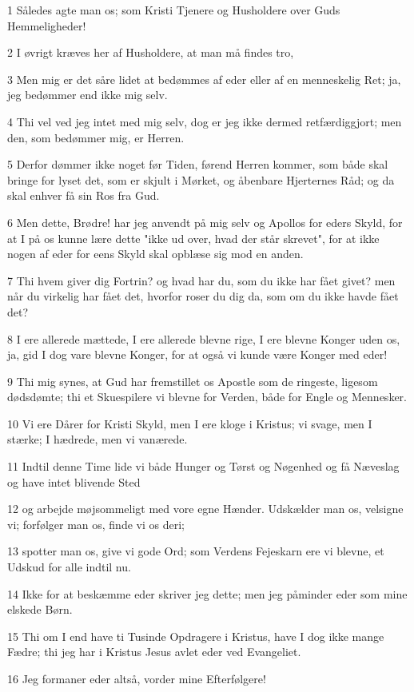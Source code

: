 \par 1 Således agte man os; som Kristi Tjenere og Husholdere over Guds Hemmeligheder!
\par 2 I øvrigt kræves her af Husholdere, at man må findes tro,
\par 3 Men mig er det såre lidet at bedømmes af eder eller af en menneskelig Ret; ja, jeg bedømmer end ikke mig selv.
\par 4 Thi vel ved jeg intet med mig selv, dog er jeg ikke dermed retfærdiggjort; men den, som bedømmer mig, er Herren.
\par 5 Derfor dømmer ikke noget før Tiden, førend Herren kommer, som både skal bringe for lyset det, som er skjult i Mørket, og åbenbare Hjerternes Råd; og da skal enhver få sin Ros fra Gud.
\par 6 Men dette, Brødre! har jeg anvendt på mig selv og Apollos for eders Skyld, for at I på os kunne lære dette "ikke ud over, hvad der står skrevet", for at ikke nogen af eder for eens Skyld skal opblæse sig mod en anden.
\par 7 Thi hvem giver dig Fortrin? og hvad har du, som du ikke har fået givet? men når du virkelig har fået det, hvorfor roser du dig da, som om du ikke havde fået det?
\par 8 I ere allerede mættede, I ere allerede blevne rige, I ere blevne Konger uden os, ja, gid I dog vare blevne Konger, for at også vi kunde være Konger med eder!
\par 9 Thi mig synes, at Gud har fremstillet os Apostle som de ringeste, ligesom dødsdømte; thi et Skuespilere vi blevne for Verden, både for Engle og Mennesker.
\par 10 Vi ere Dårer for Kristi Skyld, men I ere kloge i Kristus; vi svage, men I stærke; I hædrede, men vi vanærede.
\par 11 Indtil denne Time lide vi både Hunger og Tørst og Nøgenhed og få Næveslag og have intet blivende Sted
\par 12 og arbejde møjsommeligt med vore egne Hænder. Udskælder man os, velsigne vi; forfølger man os, finde vi os deri;
\par 13 spotter man os, give vi gode Ord; som Verdens Fejeskarn ere vi blevne, et Udskud for alle indtil nu.
\par 14 Ikke for at beskæmme eder skriver jeg dette; men jeg påminder eder som mine elskede Børn.
\par 15 Thi om I end have ti Tusinde Opdragere i Kristus, have I dog ikke mange Fædre; thi jeg har i Kristus Jesus avlet eder ved Evangeliet.
\par 16 Jeg formaner eder altså, vorder mine Efterfølgere!
